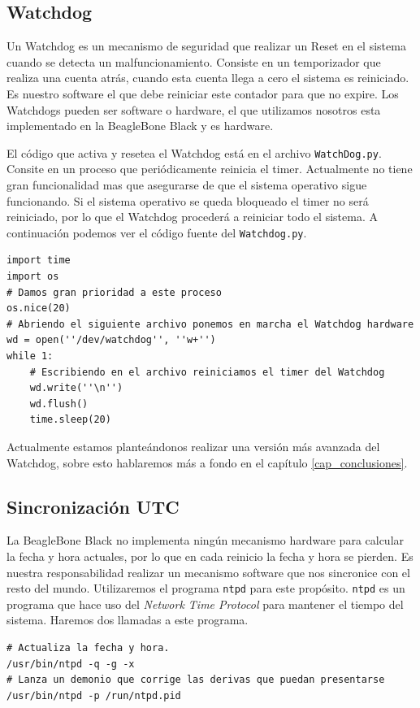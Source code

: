 	\subsection{Watchdog}
		Un Watchdog \cite{WatchDogWiki} es un mecanismo de seguridad que realizar un Reset en el sistema cuando se detecta un
		malfuncionamiento. Consiste en un temporizador que realiza una cuenta atrás, cuando esta cuenta llega a cero el sistema es reiniciado.
		Es nuestro software el que debe reiniciar este contador para que no expire. Los Watchdogs pueden ser software o hardware, el que
		utilizamos nosotros esta implementado en la BeagleBone Black y es hardware.
		\par
		El código que activa y resetea el Watchdog está en el archivo \texttt{WatchDog.py}. Consite en un proceso que periódicamente reinicia
		el timer. Actualmente no tiene gran funcionalidad mas que asegurarse de que el sistema operativo sigue funcionando. Si el sistema
		operativo se queda bloqueado el timer no será reiniciado, por lo que el Watchdog procederá a reiniciar todo el sistema. A continuación
		podemos ver el código fuente del \texttt{Watchdog.py}.
		\begin{lstlisting}
import time
import os
# Damos gran prioridad a este proceso
os.nice(20)
# Abriendo el siguiente archivo ponemos en marcha el Watchdog hardware
wd = open(''/dev/watchdog'', ''w+'')
while 1:
	# Escribiendo en el archivo reiniciamos el timer del Watchdog
	wd.write(''\n'')
	wd.flush() 
	time.sleep(20)
		\end{lstlisting}
		Actualmente estamos planteándonos realizar una versión más avanzada del Watchdog, sobre esto hablaremos más a fondo en el capítulo 
		\ref{cap_conclusiones}.
	\subsection{Sincronización UTC}
		La BeagleBone Black no implementa ningún mecanismo hardware para calcular la fecha y hora actuales, por lo que en cada reinicio la
		fecha y hora se pierden. Es nuestra responsabilidad realizar un mecanismo software que nos sincronice con el resto del mundo\cite{ntpd}.
		Utilizaremos el programa \texttt{ntpd} para este propósito. \texttt{ntpd} es un programa que hace uso del 
		\emph{Network Time Protocol}\cite{ntpWiki} para mantener el tiempo del sistema. Haremos dos llamadas a este programa.
		\begin{lstlisting}
# Actualiza la fecha y hora.
/usr/bin/ntpd -q -g -x
# Lanza un demonio que corrige las derivas que puedan presentarse
/usr/bin/ntpd -p /run/ntpd.pid
		\end{lstlisting}


